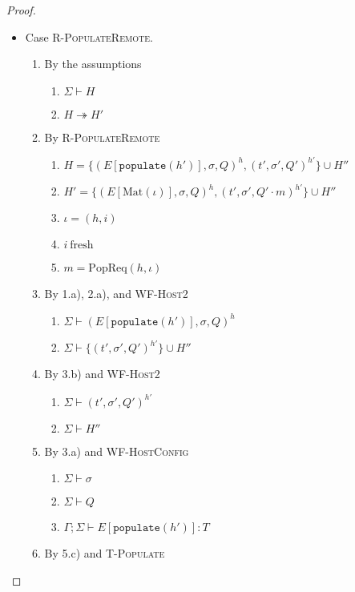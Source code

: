 \documentclass{article}
\theoremstyle{definition}
\newcommand{\PopReq}[2]{\text{PopReq}(#1, #2)}
\begin{document}
\begin{proof}
\begin{itemize}
\item Case \textsc{R-PopulateRemote}.
\begin{enumerate}
\item By the assumptions
  \begin{enumerate}[label=(\alph*)]
  \item $\Sigma \vdash H$
  \item $H \twoheadrightarrow H'$
  \end{enumerate}
\item By \textsc{R-PopulateRemote}
  \begin{enumerate}[label=(\alph*)]
  \item $H = \{ (E[\texttt{populate}(h')], \sigma, Q)^h, (t', \sigma', Q')^{h'} \} \cup H''$
  \item $H' = \{ (E[\text{Mat}(\iota)], \sigma, Q)^h, (t', \sigma', Q' \cdot m)^{h'} \} \cup H''$
  \item $\iota     = (h, i)$
  \item $i~\text{fresh}$
  \item $m = {\PopReq h \iota}$
  \end{enumerate}
\item By 1.a), 2.a), and \textsc{WF-Host2}
  \begin{enumerate}[label=(\alph*)]
  \item $\Sigma \vdash (E[\texttt{populate}(h')], \sigma, Q)^h$
  \item $\Sigma \vdash \{ (t', \sigma', Q')^{h'} \} \cup H''$
  \end{enumerate}
\item By 3.b) and \textsc{WF-Host2}
  \begin{enumerate}[label=(\alph*)]
  \item $\Sigma \vdash (t', \sigma', Q')^{h'}$
  \item $\Sigma \vdash H''$
  \end{enumerate}
\item By 3.a) and \textsc{WF-HostConfig}
  \begin{enumerate}[label=(\alph*)]
  \item $\Sigma \vdash \sigma$
  \item $\Sigma \vdash Q$
  \item $\Gamma ; \Sigma \vdash E[\texttt{populate}(h')] : T$
  \end{enumerate}
\item By 5.c) and \textsc{T-Populate}

\end{enumerate}
\end{itemize}
\end{proof}
\end{document}
